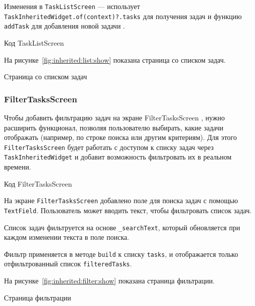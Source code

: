 Изменения в \texttt{TaskListScreen} --- использует
\texttt{TaskInheritedWidget.of(context)?.tasks}
для получения задач и функцию \texttt{addTask} для добавления новой задачи
.

\begin{image}
	\caption{Код TaskListScreen}
	\label{fig:inherited:list}
\end{image}

На рисунке~\ref{fig:inherited:list:show} показана страница со списком задач.

\begin{image}
	\caption{Страница со списком задач}
	\label{fig:inherited:list:show}
\end{image}

\subsubsection{FilterTasksScreen}

Чтобы добавить фильтрацию задач
на экране FilterTasksScreen ,
нужно расширить функционал, позволяя пользователю выбирать,
какие задачи отображать (например, по строке поиска или другим критериям).
Для этого \texttt{FilterTasksScreen} будет работать с доступом к списку задач
через \texttt{TaskInheritedWidget}
и добавит возможность фильтровать их в реальном времени.

\begin{image}
	\caption{Код FilterTasksScreen}
	\label{fig:inherited:filter}
\end{image}

На экране \texttt{FilterTasksScreen} добавлено поле
для поиска задач с помощью \texttt{TextField}.
Пользователь может вводить текст, чтобы фильтровать список задач.\par
Список задач фильтруется на основе \texttt{\_searchText},
который обновляется при каждом изменении текста в поле поиска.\par
Фильтр применяется в методе \texttt{build} к списку \texttt{tasks},
и отображается только отфильтрованный список \texttt{filteredTasks}.

На рисунке~\ref{fig:inherited:filter:show} показана страница фильтрации.

\begin{image}
	\caption{Страница фильтрации}
	\label{fig:inherited:filter:show}
\end{image}

